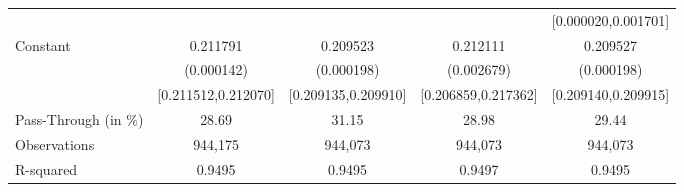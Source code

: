 {\begin{tabular}{l*{4}{c}}
                    &                     &                     &                     &[0.000020,0.001701]         \\
Constant            &    0.211791\sym{***}&    0.209523\sym{***}&    0.212111\sym{***}&    0.209527\sym{***}\\
                    &  (0.000142)         &  (0.000198)         &  (0.002679)         &  (0.000198)         \\
                    &[0.211512,0.212070]         &[0.209135,0.209910]         &[0.206859,0.217362]         &[0.209140,0.209915]         \\
\midrule
Pass-Through (in \%)&       28.69         &       31.15         &       28.98         &       29.44         \\
Observations        &     944,175         &     944,073         &     944,073         &     944,073         \\
R-squared           &      0.9495         &      0.9495         &      0.9497         &      0.9495         \\
\bottomrule
\end{tabular}
}
